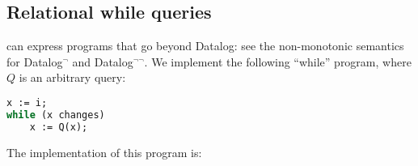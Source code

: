 \begin{comment}
\item[Weakening assumptions]

The theory as presented requires streams to be over group elements.  However,
this is necessary only if we want to automatically compute incremental 
versions of the operators --- the addition and negation operations are
required for building $\I$ and $\D$.  The streaming circuits model
works very well on much simpler algebraic structures.  The $0$ element
is still needed to define $\zm$ and time-invariance.  Circuits that
mix streams over groups with arbitrary streams are well-defined.  However,
the zero-preservation property is required even for such general computations, 
for the time-invariance of the resulting circuits.
\end{comment}

\begin{comment}
\item[Checkpoint/restore:]

The entire ``state'' of a streaming circuits is ``stored'' in its $\zm$ and $\lift{\zm}$
elements.  Saving this state amounts to taking a checkpoint of the streaming
system.  Restoring the state amounts to restoring a previous state.  These
operations can be the fundamental primitives for providing a fault-tolerant
implementation of a streaming query system. 

\item[Materialized views:]

An incremental view maintenance system is not a database -- it only computes changes
to views when given changes to tables.  However, it can be integrated with a 
database, by providing capabilities for \emph{querying} both tables and views.
An input table is just the integral of all the changes to the table.  This makes
possible building a system that is both stateful (like a database) and streaming
(like an incremental view maintenance system).
\end{comment}

\subsection{Relational while queries}

\dbsp can express programs that go beyond Datalog:
see the non-monotonic semantics for Datalog$^\neg$ and 
Datalog$^{\neg\neg}$\cite{Abiteboul-book95}.
We implement the following
``while'' program, where $Q$ is an arbitrary query:
{\small
\begin{lstlisting}[language=Pascal]
x := i;
while (x changes)
    x := Q(x);
\end{lstlisting}}
The \dbsp implementation of this program is:

